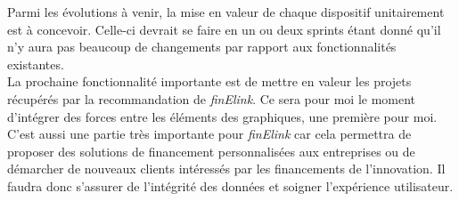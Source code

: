 Parmi les évolutions à venir, la mise en valeur de chaque dispositif unitairement est à concevoir. Celle-ci devrait se faire en un ou deux sprints étant donné qu'il n'y aura pas beaucoup de changements par rapport aux fonctionnalités existantes.\\

La prochaine fonctionnalité importante est de mettre en valeur les projets récupérés par la recommandation de \textit{finElink}. Ce sera pour moi le moment d'intégrer des forces entre les éléments des graphiques, une première pour moi. C'est aussi une partie très importante pour \textit{finElink} car cela permettra de proposer des solutions de financement personnalisées aux entreprises ou de démarcher de nouveaux clients intéressés par les financements de l'innovation. Il faudra donc s'assurer de l'intégrité des données et soigner l'expérience utilisateur.